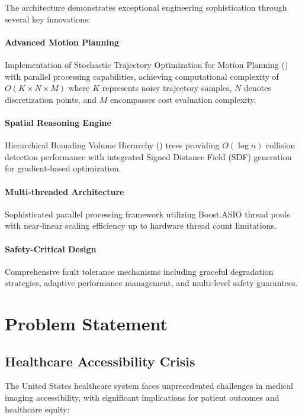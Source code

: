 The \rus{} architecture demonstrates exceptional engineering sophistication through several key innovations:

\paragraph{Advanced Motion Planning}
Implementation of Stochastic Trajectory Optimization for Motion Planning (\stomp{}) with parallel processing capabilities, achieving computational complexity of $O(K \times N \times M)$ where $K$ represents noisy trajectory samples, $N$ denotes discretization points, and $M$ encompasses cost evaluation complexity.

\paragraph{Spatial Reasoning Engine}
Hierarchical Bounding Volume Hierarchy (\bvh{}) trees providing $O(\log n)$ collision detection performance with integrated Signed Distance Field (SDF) generation for gradient-based optimization.

\paragraph{Multi-threaded Architecture}
Sophisticated parallel processing framework utilizing Boost.ASIO thread pools with near-linear scaling efficiency up to hardware thread count limitations.

\paragraph{Safety-Critical Design}
Comprehensive fault tolerance mechanisms including graceful degradation strategies, adaptive performance management, and multi-level safety guarantees.

\section{Problem Statement}
\label{sec:problem_statement}

\subsection{Healthcare Accessibility Crisis}

The United States healthcare system faces unprecedented challenges in medical imaging accessibility, with significant implications for patient outcomes and healthcare equity:

